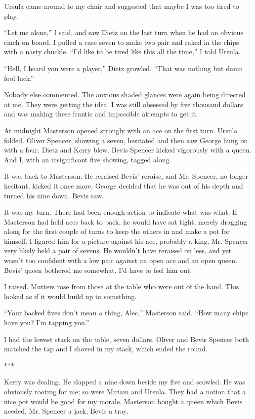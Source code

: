 \documentclass{novel}
\begin{document}
{Ursula came around to my chair and suggested that maybe I was too tired to play.

“Let me alone,” I said, and saw Dietz on the last turn when he had an obvious cinch on board. I pulled a case seven to make two pair and raked in the chips with a nasty chuckle. “I’d like to be tired like this all the time,” I told Ursula.

“Hell, I heard you were a player,” Dietz growled. “That was nothing but damn fool luck.”

Nobody else commented. The anxious shaded glances were again being directed at me. They were getting the idea. I was still obsessed by five thousand dollars and was making these frantic and impossible attempts to get it.

At midnight Masterson opened strongly with an ace on the first turn. Ursula folded. Oliver Spencer, showing a seven, hesitated and then saw George hung on with a four. Dietz and Kerry blew. Bevis Spencer kicked vigorously with a queen. And I, with an insignificant five showing, tagged along.

It was back to Masterson. He reraised Bevis’ reraise, and Mr. Spencer, no longer hesitant, kicked it once more. George decided that he was out of his depth and turned his nine down. Bevis saw.

It was my turn. There had been enough action to indicate what was what. If Masterson had held aces back to back, he would have sat tight, merely dragging along for the first couple of turns to keep the others in and make a pot for himself. I figured him for a picture against his ace, probably a king. Mr. Spencer very likely held a pair of sevens. He wouldn’t have reraised on less, and yet wasn’t too confident with a low pair against an open ace and an open queen. Bevis’ queen bothered me somewhat. I’d have to feel him out.

I raised. Mutters rose from those at the table who were out of the hand. This looked as if it would build up to something.

“Your backed fives don’t mean a thing, Alec,” Masterson said. “How many chips have you? I’m tapping you.”

I had the lowest stack on the table, seven dollars. Oliver and Bevis Spencer both matched the tap and I shoved in my stack, which ended the round.

***

Kerry was dealing. He slapped a nine down beside my five and scowled. He was obviously rooting for me; so were Miriam and Ursula. They had a notion that a nice pot would be good for my morale. Masterson bought a queen which Bevis needed, Mr. Spencer a jack, Bevis a tray.

}
\end{document}
